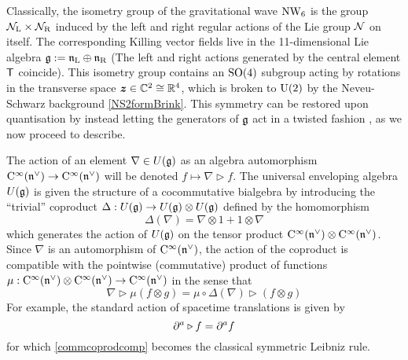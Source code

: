 Classically, the isometry group of the gravitational wave $\operatorname{NW}_6$ is the group
${\mathcal N}_{\rm L}\times{\mathcal N}_{\rm R}$ induced by the left and right regular actions
of the Lie group ${\mathcal N}$ on itself. The corresponding Killing vector fields live
in the 11-dimensional Lie algebra ${\mathfrak g}:={\mathfrak n}_{\rm L}\oplus{\mathfrak n}_{\rm R}$ (The
left and right actions generated by the central element ${\sf T}$ coincide). This
isometry group contains an ${\rm SO}(4)$ subgroup acting by rotations in the
transverse space ${{\boldsymbol {z} }}\in{\mathbb C}^2\cong{\mathbb R}^4$, which is broken to ${\rm U}(2)$ by the
Neveu-Schwarz background \eqref{NS2formBrink}. This symmetry can be restored
upon quantisation by instead letting the generators of ${\mathfrak g}$ act in a twisted
fashion \cite{CPT1,CKNT1,Wess1}, as we now proceed to describe.

The action of an element $\nabla\in U({\mathfrak g})$ as an algebra automorphism
${\rm C}^\infty({\mathfrak n}^\vee)\to{\rm C}^\infty({\mathfrak n}^\vee)$ will be denoted
$f\mapsto\nabla\triangleright f$. The universal enveloping algebra $U({\mathfrak g})$ is
given the structure of a cocommutative bialgebra by introducing the ``trivial''
coproduct $\Delta:U({\mathfrak g})\to U({\mathfrak g})\otimes U({\mathfrak g})$ defined by the homomorphism
\begin{equation}
  \label{trivialcoprod}
  \Delta(\nabla)=\nabla\otimes1+1\otimes\nabla
\end{equation}
which generates the action of $U({\mathfrak g})$ on the tensor product
${\rm C}^\infty({\mathfrak n}^\vee)\otimes{\rm C}^\infty({\mathfrak n}^\vee)$. Since $\nabla$ is an automorphism
of ${\rm C}^\infty({\mathfrak n}^\vee)$, the action of the coproduct is compatible with the
pointwise (commutative) product of functions
$\mu:{\rm C}^\infty({\mathfrak n}^\vee)\otimes{\rm C}^\infty({\mathfrak n}^\vee)\to{\rm C}^\infty({\mathfrak n}^\vee)$ in the
sense that
\begin{equation}
  \label{commcoprodcomp}
  \nabla\triangleright\mu(f\otimes g)=\mu\circ\Delta(\nabla)
  \triangleright(f\otimes g)
\end{equation}
For example, the standard action of spacetime translations is given by
\begin{equation}
  \label{commtranslaction}
  \partial^a\triangleright f=\partial^af
\end{equation}
for which \eqref{commcoprodcomp} becomes the classical symmetric Leibniz rule.

